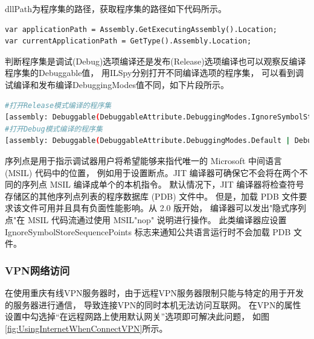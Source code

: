 \documentclass{book}
\begin{document}
dllPath为程序集的路径，获取程序集的路径如下代码所示。

\begin{lstlisting}[language={[Sharp]C},caption=获取程序集路径]
var applicationPath = Assembly.GetExecutingAssembly().Location;
var currentApplicationPath = GetType().Assembly.Location;
\end{lstlisting}

判断程序集是调试(Debug)选项编译还是发布(Release)选项编译也可以观察反编译程序集的Debuggable值，
用ILSpy分别打开不同编译选项的程序集，
可以看到调试编译和发布编译DebuggingModes值不同，如下片段所示。

\begin{lstlisting}[language=Bash,caption=查看程序集调试模式]
#打开Release模式编译的程序集
[assembly: Debuggable(DebuggableAttribute.DebuggingModes.IgnoreSymbolStoreSequencePoints)]
#打开Debug模式编译的程序集
[assembly: Debuggable(DebuggableAttribute.DebuggingModes.Default | DebuggableAttribute.DebuggingModes.DisableOptimizations | DebuggableAttribute.DebuggingModes.IgnoreSymbolStoreSequencePoints | DebuggableAttribute.DebuggingModes.EnableEditAndContinue)]
\end{lstlisting}

序列点是用于指示调试器用户将希望能够来指代唯一的 Microsoft 中间语言 (MSIL) 代码中的位置，
例如用于设置断点。JIT 编译器可确保它不会将在两个不同的序列点 MSIL 编译成单个的本机指令。
默认情况下，JIT 编译器将检查符号存储区的其他序列点列表的程序数据库 (PDB) 文件中。
但是，加载 PDB 文件要求该文件可用并且具有负面性能影响。从 2.0 版开始，
编译器可以发出"隐式序列点"在 MSIL 代码流通过使用 MSIL"nop" 说明进行操作。
此类编译器应设置 IgnoreSymbolStoreSequencePoints 标志来通知公共语言运行时不会加载 PDB 文件。

\subsubsection{VPN网络访问}

在使用重庆有线VPN服务器时，由于远程VPN服务器限制只能与特定的用于开发的服务器进行通信，
导致连接VPN的同时本机无法访问互联网。
在VPN的属性设置中勾选掉“在远程网路上使用默认网关”选项即可解决此问题，
如图\ref{fig:UsingInternetWhenConnectVPN}所示。
\end{document}
